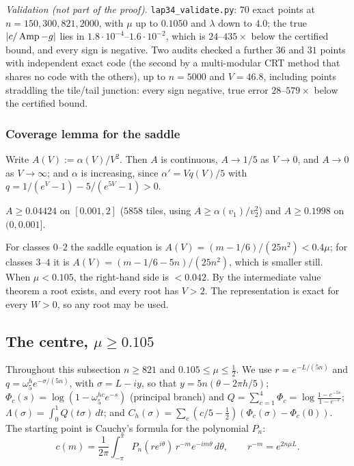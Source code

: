 \emph{Validation (not part of the proof).} \texttt{lap34\_validate.py}: $70$ exact points at $n=150,300,821,2000$, with
$\mu$ up to $0.1050$ and $\lambda$ down to $4.0$; the true $|c/\operatorname{Amp}-g|$ lies in $1.8\cdot10^{-4}$--$1.6\cdot10^{-2}$, which
is $24$--$435\times$ below the certified bound, and every sign is negative. Two audits checked a further $36$ and $31$
points with independent exact code (the second by a multi-modular CRT method that shares no code with the others), up to
$n=5000$ and $V=46.8$, including points straddling the tile/tail junction: every sign negative, true error $28$--$579\times$
below the certified bound.

\subsubsection{Coverage lemma for the saddle}\label{sec:t-sadcov}
Write $A(V):=\alpha(V)/V^2$. Then $A$ is continuous, $A\to1/5$ as $V\to0$, and $A\to0$ as $V\to\infty$; and $\alpha$ is
increasing, since $\alpha'=Vq(V)/5$ with $q=1/(e^V-1)-5/(e^{5V}-1)>0$.

\begin{lemma}\label{lem:t-sadcov}
$A\ge0.04424$ on $[0.001,2]$ ($5858$ tiles, using $A\ge\alpha(v_1)/v_2^2$) and $A\ge0.1998$ on $(0,0.001]$.
\end{lemma}

For classes $0$--$2$ the saddle equation is $A(V)=(m-1/6)/(25n^2)<0.4\mu$; for classes $3$--$4$ it is
$A(V)=(m-1/6-5n)/(25n^2)$, which is smaller still. When $\mu<0.105$, the right-hand side is $<0.042$. By the intermediate
value theorem a root exists, and every root has $V>2$. The representation is exact for every $W>0$, so any root may be
used.

\subsection{The centre, \texorpdfstring{$\mu\ge0.105$}{mu >= 0.105}}\label{sec:t-centre}

Throughout this subsection $n\ge821$ and $0.105\le\mu\le\tfrac12$. We use $r=e^{-L/(5n)}$ and
$q=\omega_5^he^{-\sigma/(5n)}$, with $\sigma=L-iy$, so that $y=5n(\theta-2\pi h/5)$;
$\Phi_c(s)=\log(1-\omega_5^{hc}e^{-s})$ (principal branch) and $Q=\sum_{c=1}^4\Phi_c=\log\frac{1-e^{-5s}}{1-e^{-s}}$;
$\Lambda(\sigma)=\int_0^1Q(t\sigma)\,dt$; and $C_h(\sigma)=\sum_c(c/5-\tfrac12)(\Phi_c(\sigma)-\Phi_c(0))$. The starting
point is Cauchy's formula for the polynomial $P_n$:
\[
c(m)=\frac1{2\pi}\int_{-\pi}^{\pi}P_n(re^{i\theta})\,r^{-m}e^{-im\theta}\,d\theta,\qquad r^{-m}=e^{2n\mu L}.
\]

